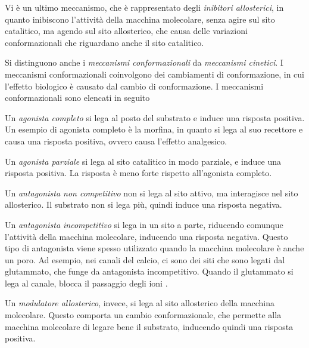 
Vi è un ultimo meccanismo, che è rappresentato degli \emph{inibitori
allosterici}, in quanto inibiscono l'attività della macchina molecolare,
senza agire sul sito catalitico, ma agendo sul sito allosterico, che
causa delle variazioni conformazionali che riguardano anche il sito
catalitico.

Si distinguono anche i \emph{meccanismi conformazionali} da
\emph{meccanismi cinetici}. I meccanismi conformazionali coinvolgono dei
cambiamenti di conformazione, in cui l'effetto biologico è causato dal
cambio di conformazione. I meccanismi conformazionali sono elencati in
seguito

Un \emph{agonista completo} si lega al posto del substrato e induce una
risposta positiva. Un esempio di agonista completo è la morfina, in
quanto si lega al suo recettore e causa una risposta positiva, ovvero
causa l'effetto analgesico.


Un \emph{agonista parziale} si lega al sito catalitico in modo parziale,
e induce una risposta positiva. La risposta è meno forte rispetto
all'agonista completo.


Un \emph{antagonista non competitivo} non si lega al sito attivo, ma
interagisce nel sito allosterico. Il substrato non si lega più, quindi
induce una risposta negativa.


Un \emph{antagonista incompetitivo} si lega in un sito a parte,
riducendo comunque l'attività della macchina molecolare, inducendo una
risposta negativa. Questo tipo di antagonista viene spesso utilizzato
quando la macchina molecolare è anche un poro. Ad esempio, nei canali
del calcio, ci sono dei siti che sono legati dal glutammato, che funge
da antagonista incompetitivo. Quando il glutammato si lega al canale,
blocca il passaggio degli ioni .


Un \emph{modulatore allosterico}, invece, si lega al sito allosterico
della macchina molecolare. Questo comporta un cambio conformazionale,
che permette alla macchina molecolare di legare bene il substrato,
inducendo quindi una risposta positiva.

